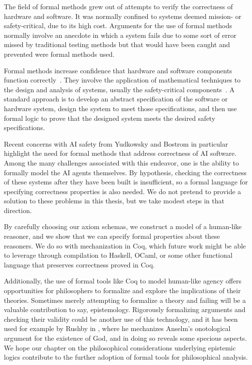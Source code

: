 The field of formal methods grew out of attempts to verify the correctness of hardware and software. It was normally confined to systems deemed mission- or safety-critical, due to its high cost. Arguments for the use of formal methods normally involve an anecdote in which a system fails due to some sort of error missed by traditional testing methods but that would have been caught and prevented were formal methods used.

Formal methods increase confidence that hardware and software components function correctly~\cite{RushbyFMbook}. They involve the application of mathematical techniques to the design and analysis of systems, usually the safety-critical components~\cite{johnson_butler_fm}. A standard approach is to develop an abstract specification of the software or hardware system, design the system to meet those specifications, and then use formal logic to prove that the designed system meets the desired safety specifications.

Recent concerns with AI safety from Yudkowsky \cite{yudkowski} and Bostrom \cite{bostrom} in particular highlight the need for formal methods that address correctness of AI software. Among the many challenges associated with this endeavor, one is the ability to formally model the AI agents themselves. By hypothesis, checking the correctness of these systems after they have been built is insufficient, so a formal language for specifying correctness properties is also needed. We do not pretend to provide a solution to these problems in this thesis, but we take modest steps in that direction.

By carefully choosing our axiom schemas, we construct a model of a human-like reasoner, and we show that we can specify formal properties about these reasoners. We do so with mechanization in Coq, which future work might be able to leverage through compilation to Haskell, OCaml, or some other functional language that preserves correctness proved in Coq.

Additionally, the use of formal tools like Coq to model human-like agency offers opportunities for philosophers to formalize and explore the implications of their theories. Sometimes merely attempting to formalize a theory and failing will be a valuable contribution to say, epistemology. Rigorously formalizing arguments and checking their validity could be another use of this technology, and it has been used for example by Rushby in \cite{rushby_ontological}, where he mechanizes Anselm's onotological argument for the existence of God, and in doing so reveals some specious aspects. We hope our chapter on the philosophical considerations underlying epistemic logics contribute to the further adoption of formal tools for philosophical analysis.

